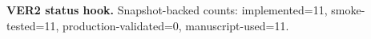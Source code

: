 \textbf{VER2 status hook.}
Snapshot-backed counts: implemented=11, smoke-tested=11,
production-validated=0, manuscript-used=11.

